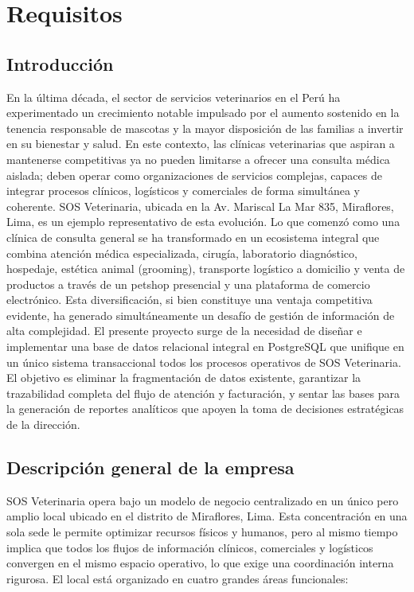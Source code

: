 \chapter{Requisitos}

\section{Introducción}

En la última década, el sector de servicios veterinarios en el Perú ha experimentado un crecimiento notable impulsado por el aumento sostenido en la tenencia responsable de mascotas y la mayor disposición de las familias a invertir en su bienestar y salud. En este contexto, las clínicas veterinarias que aspiran a mantenerse competitivas ya no pueden limitarse a ofrecer una consulta médica aislada; deben operar como organizaciones de servicios complejas, capaces de integrar procesos clínicos, logísticos y comerciales de forma simultánea y coherente. SOS Veterinaria, ubicada en la Av. Mariscal La Mar 835, Miraflores, Lima, es un ejemplo representativo de esta evolución. Lo que comenzó como una clínica de consulta general se ha transformado en un ecosistema integral que combina atención médica especializada, cirugía, laboratorio diagnóstico, hospedaje, estética animal (grooming), transporte logístico a domicilio y venta de productos a través de un petshop presencial y una plataforma de comercio electrónico. Esta diversificación, si bien constituye una ventaja competitiva evidente, ha generado simultáneamente un desafío de gestión de información de alta complejidad. El presente proyecto surge de la necesidad de diseñar e implementar una base de datos relacional integral en PostgreSQL que unifique en un único sistema transaccional todos los procesos operativos de SOS Veterinaria. El objetivo es eliminar la fragmentación de datos existente, garantizar la trazabilidad completa del flujo de atención y facturación, y sentar las bases para la generación de reportes analíticos que apoyen la toma de decisiones estratégicas de la dirección.

\section{Descripción general de la empresa}

SOS Veterinaria opera bajo un modelo de negocio centralizado en un único pero amplio local ubicado en el distrito de Miraflores, Lima. Esta concentración en una sola sede le permite optimizar recursos físicos y humanos, pero al mismo tiempo implica que todos los flujos de información clínicos, comerciales y logísticos convergen en el mismo espacio operativo, lo que exige una coordinación interna rigurosa. El local está organizado en cuatro grandes áreas funcionales:


